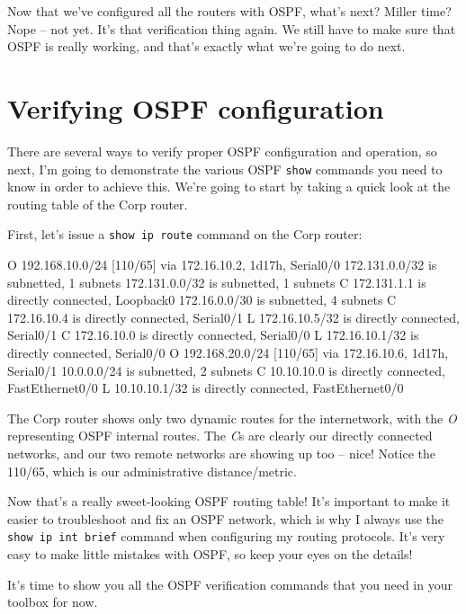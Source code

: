 Now that we've configured all the routers with OSPF, what's next? Miller
time? Nope -- not yet. It's that verification thing again. We still have
to make sure that OSPF is really working, and that's exactly what we're
going to do next.




\section{Verifying OSPF configuration}

There are several ways to verify proper OSPF configuration and
operation, so next, I'm going to demonstrate the various OSPF
\texttt{show} commands you need to know in order to achieve this. We're
going to start by taking a quick look at the routing table of the Corp
router.

First, let's issue a \texttt{show\ ip\ route} command on the Corp
router:

\begin{cli}
O    192.168.10.0/24 [110/65] via 172.16.10.2, 1d17h, Serial0/0
     172.131.0.0/32 is subnetted, 1 subnets
    172.131.0.0/32 is subnetted, 1 subnets
C        172.131.1.1 is directly connected, Loopback0
     172.16.0.0/30 is subnetted, 4 subnets
C       172.16.10.4 is directly connected, Serial0/1
L       172.16.10.5/32 is directly connected, Serial0/1
C       172.16.10.0 is directly connected, Serial0/0
L       172.16.10.1/32 is directly connected, Serial0/0
O    192.168.20.0/24 [110/65] via 172.16.10.6, 1d17h, Serial0/1
     10.0.0.0/24 is subnetted, 2 subnets
C       10.10.10.0 is directly connected, FastEthernet0/0
L       10.10.10.1/32 is directly connected, FastEthernet0/0
\end{cli}

\protect\hypertarget{c18.xhtmlux5cux23Page_766}{}{}The Corp router shows
only two dynamic routes for the internetwork, with the \emph{O}
representing OSPF internal routes. The \emph{C}s are clearly our
directly connected networks, and our two remote networks are showing up
too -- nice! Notice the 110/65, which is our administrative
distance/metric.

Now that's a really sweet-looking OSPF routing table! It's important to
make it easier to troubleshoot and fix an OSPF network, which is why I
always use the \texttt{show\ ip\ int\ brief} command when configuring my
routing protocols. It's very easy to make little mistakes with OSPF, so
keep your eyes on the details!

It's time to show you all the OSPF verification commands that you need
in your toolbox for now.

